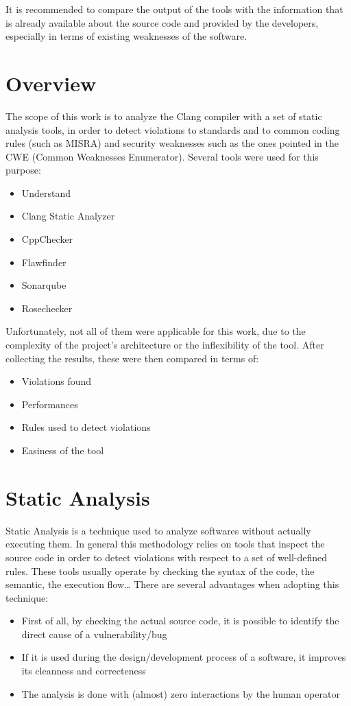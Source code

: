 It is recommended to compare the output of the tools with the information that is already available about
the source code and provided by the developers, especially in terms of existing weaknesses of the software.

\section{Overview}

The scope of this work is to analyze the Clang compiler with a set of static analysis tools, in order to detect violations to standards and to common coding rules (such as MISRA) and security weaknesses such as the ones pointed in the CWE (Common Weaknesses Enumerator).\newline\newline
Several tools were used for this purpose:
\begin{itemize}
	\item Understand
	\item Clang Static Analyzer
	\item CppChecker
	\item Flawfinder
	\item Sonarqube
	\item Rosechecker
\end{itemize}
Unfortunately, not all of them were applicable for this work, due to the complexity of the project's architecture or the inflexibility of the tool.\newline
After collecting the results, these were then compared in terms of:
\begin{itemize}
	\item Violations found
	\item Performances
	\item Rules used to detect violations
	\item Easiness of the tool
\end{itemize}
\section{Static Analysis}
Static Analysis is a technique used to analyze softwares without actually executing them.\newline
In general this methodology relies on tools that inspect the source code in order to detect violations with respect to a set of well-defined rules. These tools usually operate by checking the syntax of the code, the semantic, the execution flow\dots \newline\newline
There are several advantages when adopting this technique:
\begin{itemize}
	\item First of all, by checking the actual source code, it is possible to identify the direct cause of a vulnerability/bug
	\item If it is used during the design/development process of a software, it improves its cleanness and correcteness
	\item The analysis is done with (almost) zero interactions by the human operator
\end{itemize}

